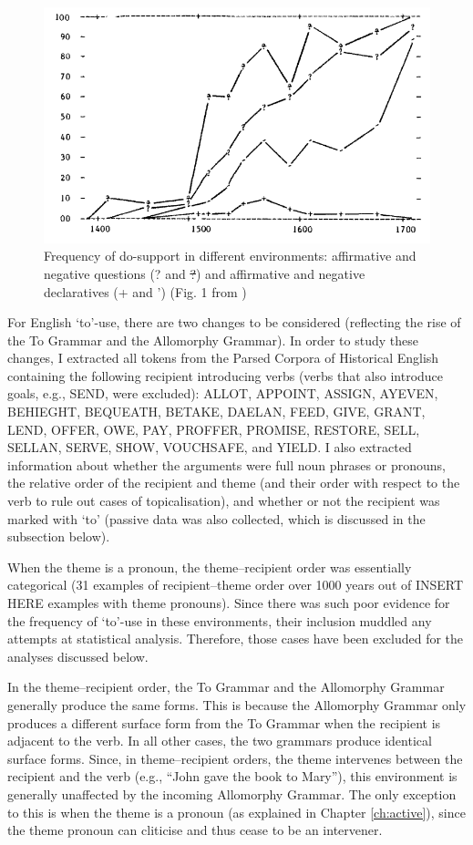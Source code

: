 	\begin{figure}[ht!]
		\includegraphics[width=.5\linewidth]{../images/kroch-graph}
		\caption{Frequency of do-support in different environments: affirmative and negative questions (? and \sout{?}) and affirmative and negative declaratives (+ and ') (Fig. 1 from \citealt{Kroch.1989})}
		\label{fig:kroch-graph}
	\end{figure}

	For English `to'-use, there are two changes to be considered (reflecting the rise of the To Grammar and the Allomorphy Grammar). In order to study these changes, I extracted all tokens from the Parsed Corpora of Historical English \citep{Kroch.2000,Taylor.2003,Kroch.2004,Taylor.2006,Kroch.2010} containing the following recipient introducing verbs (verbs that also introduce goals, e.g., SEND, were excluded): ALLOT, APPOINT, ASSIGN, AYEVEN, BEHIEGHT, BEQUEATH, BETAKE, DAELAN, FEED, GIVE, GRANT, LEND, OFFER, OWE, PAY, PROFFER, PROMISE, RESTORE, SELL, SELLAN, SERVE, SHOW, VOUCHSAFE, and YIELD. I also extracted information about whether the arguments were full noun phrases or pronouns, the relative order of the recipient and theme (and their order with respect to the verb to rule out cases of topicalisation), and whether or not the recipient was marked with `to' (passive data was also collected, which is discussed in the subsection below). 
	
	When the theme is a pronoun, the theme--recipient order was essentially categorical (31 examples of recipient--theme order over 1000 years out of INSERT HERE examples with theme pronouns). Since there was such poor evidence for the frequency of `to'-use in these environments, their inclusion muddled any attempts at statistical analysis. Therefore, those cases have been excluded for the analyses discussed below.

	In the theme--recipient order, the To Grammar and the Allomorphy Grammar generally produce the same forms. This is because the Allomorphy Grammar only produces a different surface form from the To Grammar when the recipient is adjacent to the verb. In all other cases, the two grammars produce identical surface forms. Since, in theme--recipient orders, the theme intervenes between the recipient and the verb (e.g., ``John gave the book to Mary''), this environment is generally unaffected by the incoming Allomorphy Grammar. The only exception to this is when the theme is a pronoun (as explained in Chapter \ref{ch:active}), since the theme pronoun can cliticise and thus cease to be an intervener.

